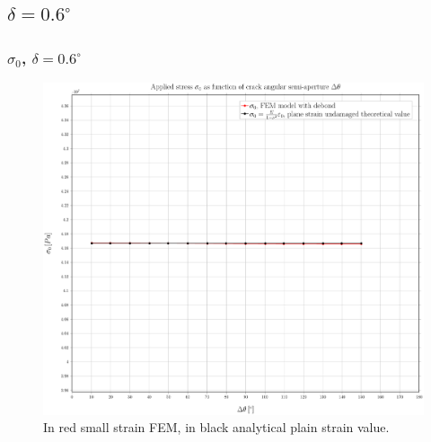 \documentclass[first,firstsupp,lastsupp,handout,last,hyperref,table]{ETHclass}
\begin{document}


\subsection{$\delta=0.6^{\circ}$}

\begin{frame}
\frametitle{\small $\sigma_{0}$, $\delta=0.6^{\circ}$}
\vspace{-0.5cm}
\centering
\captionsetup[figure]{font=scriptsize,labelfont=scriptsize}
\begin{figure}[!h]
\centering
\includegraphics[height=0.7\textheight]{2017-07-10_AbqRunSummary_SmallStrainD06_sigma-inf_Summary.pdf}
  \caption{\scriptsize In red small strain FEM, in black analytical plain strain value.}
  \label{fig:res1}
\end{figure}
\end{frame}
\end{document}
